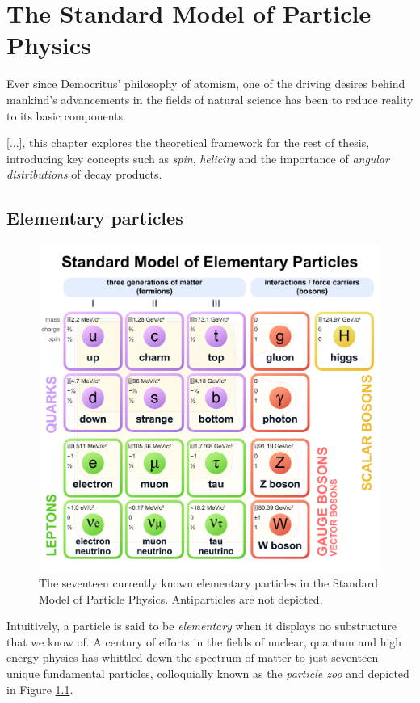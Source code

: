 \chapter{The Standard Model of Particle Physics}

Ever since Democritus' philosophy of atomism, one of the driving desires behind mankind's advancements in the fields of natural science has been to reduce reality to its basic components.

[...], this chapter explores the theoretical framework for the rest of thesis, introducing key concepts such as \textit{spin}, \textit{helicity} and the importance of \textit{angular distributions} of decay products.

\section{Elementary particles}
\begin{figure}[t!]
	\centering
	\includegraphics[scale=0.15]{graphics/01-standard_model/Standard_Model_of_Elementary_Particles.pdf}
	\caption[Currently known Standard Model elementary particles.]{The seventeen currently known elementary particles in the Standard Model of Particle Physics. Antiparticles are not depicted.}
	\label{fig:particle_zoo}
\end{figure}

Intuitively, a particle is said to be \textit{elementary} when it displays no substructure that we know of. 
A century of efforts in the fields of nuclear, quantum and high energy physics has whittled down the spectrum of matter to just seventeen unique fundamental particles, colloquially known as the \textit{particle zoo} and depicted in Figure \ref{fig:particle_zoo}.

